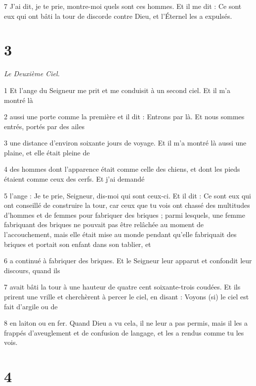 \par 7 J'ai dit, je te prie, montre-moi quels sont ces hommes. Et il me dit : Ce sont eux qui ont bâti la tour de discorde contre Dieu, et l'Éternel les a expulsés.

\chapter{3}

\par \textit{Le Deuxième Ciel.}

\par 1 Et l'ange du Seigneur me prit et me conduisit à un second ciel. Et il m'a montré là

\par 2 aussi une porte comme la première et il dit : Entrons par là. Et nous sommes entrés, portés par des ailes

\par 3 une distance d'environ soixante jours de voyage. Et il m'a montré là aussi une plaine, et elle était pleine de

\par 4 des hommes dont l'apparence était comme celle des chiens, et dont les pieds étaient comme ceux des cerfs. Et j'ai demandé

\par 5 l'ange : Je te prie, Seigneur, dis-moi qui sont ceux-ci. Et il dit : Ce sont eux qui ont conseillé de construire la tour, car ceux que tu vois ont chassé des multitudes d'hommes et de femmes pour fabriquer des briques ; parmi lesquels, une femme fabriquant des briques ne pouvait pas être relâchée au moment de l'accouchement, mais elle était mise au monde pendant qu'elle fabriquait des briques et portait son enfant dans son tablier, et

\par 6 a continué à fabriquer des briques. Et le Seigneur leur apparut et confondit leur discours, quand ils

\par 7 avait bâti la tour à une hauteur de quatre cent soixante-trois coudées. Et ils prirent une vrille et cherchèrent à percer le ciel, en disant : Voyons (si) le ciel est fait d'argile ou de

\par 8 en laiton ou en fer. Quand Dieu a vu cela, il ne leur a pas permis, mais il les a frappés d'aveuglement et de confusion de langage, et les a rendus comme tu les vois.

\chapter{4}

